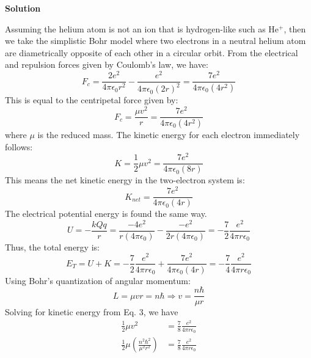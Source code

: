 \documentclass[12pt]{article}
\begin{document}
\setcounter{equation}{0}
\vspace{0.5cm}
\begin{adjustwidth}{2.5em}{0pt}
\begin{siderules}
 {\color{cyan} \textbf{Solution}
 
Assuming the helium atom is not an ion that is hydrogen-like such as He$^{+}$, then we take the simplistic Bohr model where two electrons in a neutral helium atom are diametrically opposite of each other in a circular orbit. From the electrical and repulsion forces given by Coulomb's law, we have:
\begin{equation}
F_c = \frac{2e^2}{4\pi \epsilon_0 r^2} - \frac{e^2}{4\pi \epsilon_0(2r)^2} = \frac{7e^2}{4\pi \epsilon_0(4r^2)}
\end{equation}
This is equal to the centripetal force given by:
\begin{equation}
F_c = \frac{\mu v^2}{r} = \frac{7e^2}{4\pi \epsilon_0(4r^2)}
\end{equation}
where $\mu$ is the reduced mass. The kinetic energy for each electron immediately follows:
\begin{equation}
K = \frac{1}{2}\mu v^2 = \frac{7e^2}{4\pi \epsilon_0(8r)}
\end{equation}
This means the net kinetic energy in the two-electron system is:
\begin{equation}
K_{net} = \frac{7e^2}{4\pi \epsilon_0(4r)}
\end{equation}
The electrical potential energy is found the same way.
\begin{equation}
U = -\frac{kQq}{r} = \frac{-4e^2}{r(4\pi\epsilon_0)} - \frac{-e^2}{2r(4\pi\epsilon_0)} = -\frac{7}{2}\frac{e^2}{4\pi r\epsilon_0}
\end{equation}
Thus, the total energy is:
\begin{equation}
E_T = U + K = -\frac{7}{2}\frac{e^2}{4\pi r\epsilon_0} + \frac{7e^2}{4\pi \epsilon_0(4r)} = -\frac{7}{4}\frac{e^2}{4\pi r\epsilon_0}
\end{equation}
Using Bohr's quantization of angular momentum:
\begin{equation}
L = \mu vr = n\hbar \Rightarrow v = \frac{n\hbar}{\mu r}
\end{equation}
Solving for kinetic energy from Eq. 3, we have
\begin{equation}
\begin{aligned}
\frac{1}{2}\mu v^2 &= \frac{7}{8} \frac{e^2}{4\pi r \epsilon_0} \\
\frac{1}{2}\mu \left( \frac{n^2\hbar^2}{\mu^2 r^2}\right) &= \frac{7}{8} \frac{e^2}{4\pi r \epsilon_0} \\

\end{aligned}
\end{equation}}
\end{siderules}
\end{adjustwidth}
\end{document}
